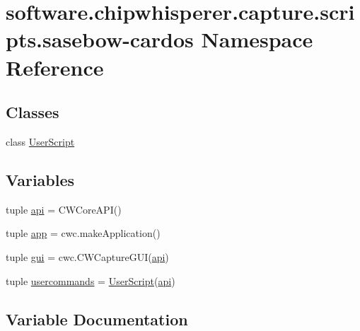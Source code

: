 \hypertarget{namespacesoftware_1_1chipwhisperer_1_1capture_1_1scripts_1_1sasebow-cardos}{}\section{software.\+chipwhisperer.\+capture.\+scripts.\+sasebow-\/cardos Namespace Reference}
\label{namespacesoftware_1_1chipwhisperer_1_1capture_1_1scripts_1_1sasebow-cardos}
\subsection*{Classes}
\begin{DoxyCompactItemize}
\item 
class \hyperlink{classsoftware_1_1chipwhisperer_1_1capture_1_1scripts_1_1sasebow-cardos_1_1UserScript}{User\+Script}
\end{DoxyCompactItemize}
\subsection*{Variables}
\begin{DoxyCompactItemize}
\item 
tuple \hyperlink{namespacesoftware_1_1chipwhisperer_1_1capture_1_1scripts_1_1sasebow-cardos_aa83e497babd56b17be786ef1d9a05fca}{api} = C\+W\+Core\+A\+P\+I()
\item 
tuple \hyperlink{namespacesoftware_1_1chipwhisperer_1_1capture_1_1scripts_1_1sasebow-cardos_ab596c8b99b8bda5858ba831ed7d39e09}{app} = cwc.\+make\+Application()
\item 
tuple \hyperlink{namespacesoftware_1_1chipwhisperer_1_1capture_1_1scripts_1_1sasebow-cardos_a3b7b8daf0eda683e72bbfe2464cb9e58}{gui} = cwc.\+C\+W\+Capture\+G\+U\+I(\hyperlink{namespacesoftware_1_1chipwhisperer_1_1capture_1_1scripts_1_1sasebow-cardos_aa83e497babd56b17be786ef1d9a05fca}{api})
\item 
tuple \hyperlink{namespacesoftware_1_1chipwhisperer_1_1capture_1_1scripts_1_1sasebow-cardos_ac01cc554263744b669eca645e3409d58}{usercommands} = \hyperlink{classsoftware_1_1chipwhisperer_1_1capture_1_1scripts_1_1sasebow-cardos_1_1UserScript}{User\+Script}(\hyperlink{namespacesoftware_1_1chipwhisperer_1_1capture_1_1scripts_1_1sasebow-cardos_aa83e497babd56b17be786ef1d9a05fca}{api})
\end{DoxyCompactItemize}


\subsection{Variable Documentation}
\hypertarget{namespacesoftware_1_1chipwhisperer_1_1capture_1_1scripts_1_1sasebow-cardos_aa83e497babd56b17be786ef1d9a05fca}{}
